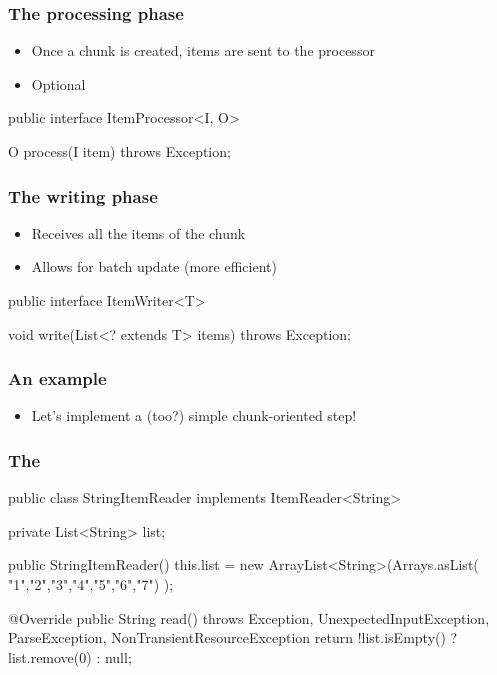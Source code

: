 \begin{frame}[fragile]
\frametitle{The processing phase}
\begin{itemize}
 \item Once a chunk is created, items are sent to the processor
 \item Optional
\end{itemize}

\begin{javacode}
public interface ItemProcessor<I, O> {

  O process(I item) throws Exception;

}
\end{javacode}
\end{frame}

\begin{frame}[fragile]
\frametitle{The writing phase}
\begin{itemize}
 \item Receives all the items of the chunk
 \item Allows for batch update (more efficient)
\end{itemize}

\begin{javacode}
public interface ItemWriter<T> {

  void write(List<? extends T> items) throws Exception;

}
\end{javacode}
\end{frame}

\begin{frame}
 \frametitle{An example}
 \begin{itemize}
  \item Let's implement a (too?) simple chunk-oriented step!  
 \end{itemize}
\end{frame}

\begin{frame}[fragile]
\frametitle{The }
\begin{javacode}
public class StringItemReader implements ItemReader<String> {

  private List<String> list;

  public StringItemReader() {
    this.list = new ArrayList<String>(Arrays.asList(
      "1","2","3","4","5","6","7")
    );
  }

  @Override
  public String read() throws Exception, UnexpectedInputException,
                       ParseException, NonTransientResourceException {
    return !list.isEmpty() ? list.remove(0) : null;
  }
}
\end{javacode}
\end{frame}

